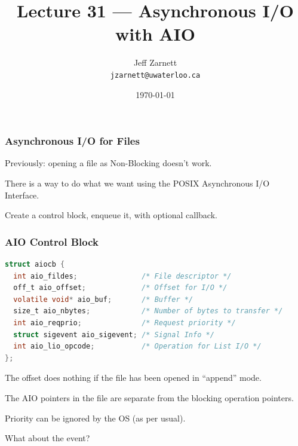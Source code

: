 

\title{Lecture 31 --- Asynchronous I/O with AIO }

\author{Jeff Zarnett \\ \small \texttt{jzarnett@uwaterloo.ca}}
\date{\today}




\begin{frame}
  \titlepage

 \end{frame}



\begin{frame}
\frametitle{Asynchronous I/O for Files}

Previously: opening a file as Non-Blocking doesn't work.

There is a way to do what we want using the POSIX Asynchronous I/O Interface.

Create a control block, enqueue it, with optional callback.

\end{frame}


\begin{frame}[fragile]
\frametitle{AIO Control Block}

\begin{lstlisting}[language=C]
struct aiocb {
  int aio_fildes;               /* File descriptor */
  off_t aio_offset;             /* Offset for I/O */
  volatile void* aio_buf;       /* Buffer */
  size_t aio_nbytes;            /* Number of bytes to transfer */
  int aio_reqprio;              /* Request priority */
  struct sigevent aio_sigevent; /* Signal Info */
  int aio_lio_opcode;           /* Operation for List I/O */
};
\end{lstlisting}

 The offset does nothing if the file has been opened in ``append'' mode.

The AIO pointers in the file are separate from the blocking operation pointers.

Priority can be ignored by the OS (as per usual).

What about the event?

\end{frame}


